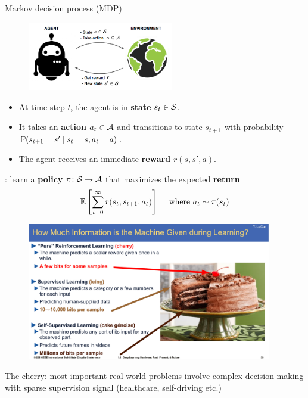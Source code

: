 \documentclass[usenames,dvipsnames,11pt,aspectratio=169]{beamer}
\begin{document}
\begin{frame}
    {Markov decision process (MDP)}
    \begin{figure}
        \includegraphics[height=3cm]{figures/rl}
    \end{figure}
    \vspace{-2em}
    \begin{itemize}
        \item At time step $t$, the agent is in \textbf{state} $s_t\in\mathcal{S}$.
        \item It takes an \textbf{action} $a_t\in\mathcal{A}$ and transitions to state $s_{t+1}$ with probability $\mathbb{P}(s_{t+1}=s'\mid s_t=s, a_t=a)$.
        \item The agent receives an immediate \textbf{reward} $r(s, s', a)$.
    \end{itemize}
    : learn a \textbf{policy} $\pi\colon \mathcal{S} \to \mathcal{A}$ that maximizes the expected \textbf{return}
    $$
    \mathbb{E}\left[ \sum_{t=0}^\infty r(s_t, s_{t+1}, a_t) \right] \quad \text{ where } a_t\sim\pi(s_t) 
    $$
\end{frame}

\begin{frame}
    {}
    \begin{figure}
        \includegraphics[height=6cm]{figures/yann-rl}
    \end{figure}
    The cherry: most important real-world problems involve complex decision making with sparse supervision signal (healthcare, self-driving etc.)

\end{frame}
\end{document}
